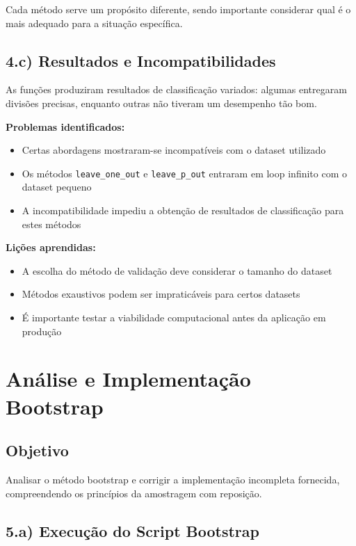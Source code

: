 \documentclass[12pt,a4paper]{article}
\begin{document}
Cada método serve um propósito diferente, sendo importante considerar qual é o mais adequado para a situação específica.

\subsection{4.c) Resultados e Incompatibilidades}

As funções produziram resultados de classificação variados: algumas entregaram divisões precisas, enquanto outras não tiveram um desempenho tão bom.

\textbf{Problemas identificados:}
\begin{itemize}
    \item Certas abordagens mostraram-se incompatíveis com o dataset utilizado
    \item Os métodos \texttt{leave\_one\_out} e \texttt{leave\_p\_out} entraram em loop infinito com o dataset pequeno
    \item A incompatibilidade impediu a obtenção de resultados de classificação para estes métodos
\end{itemize}

\textbf{Lições aprendidas:}
\begin{itemize}
    \item A escolha do método de validação deve considerar o tamanho do dataset
    \item Métodos exaustivos podem ser impraticáveis para certos datasets
    \item É importante testar a viabilidade computacional antes da aplicação em produção
\end{itemize}

\section{Análise e Implementação Bootstrap}

\subsection{Objetivo}

Analisar o método bootstrap e corrigir a implementação incompleta fornecida, compreendendo os princípios da amostragem com reposição.

\subsection{5.a) Execução do Script Bootstrap}
\end{document}
